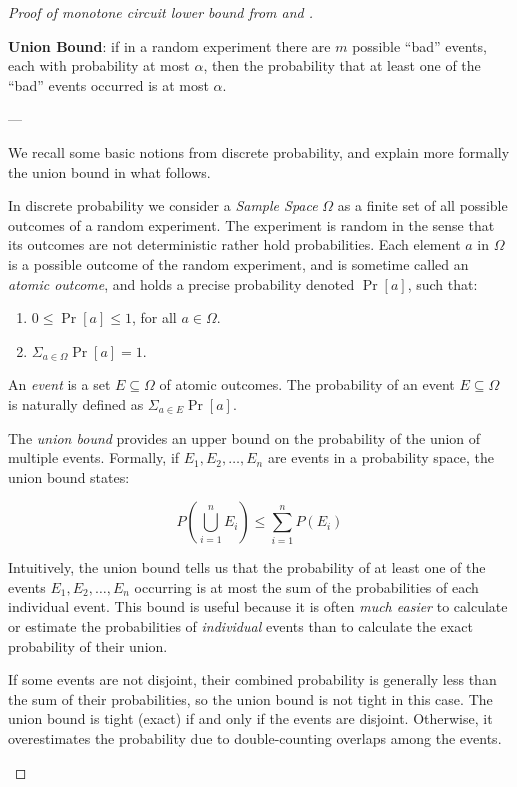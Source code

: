 \begin{proof}[Proof of  monotone circuit lower bound from  and ]
\begin{tcolorbox}[colframe=white, colback=blue!8, boxrule=0mm, sharp corners]
\textbf{Union Bound}: if in a random experiment
there are $m$ possible ``bad'' events, each with probability at most $\alpha$, then the probability that at least one of the ``bad'' events occurred is at most $\alpha$.

\small
\medskip 
---

We recall some  basic notions from  discrete probability, and explain more formally the union bound in what follows.

In discrete probability we consider a \emph{ Sample Space}
$\Omega$ as a finite set of  all possible outcomes of a random experiment. The experiment is random in the sense that its outcomes are not deterministic rather hold  probabilities. 
Each element $a$ in $\Omega$ is a possible outcome of the  random experiment, and is sometime called an \emph{atomic outcome}, and  holds a precise probability denoted $\Pr\left[a \right]$, such that:
\begin{enumerate}
\item $0\le \Pr\left[a\right]\le 1$, for all $a\in\Omega$.

\item $\Sigma_{a\in\Omega}\Pr[a]=1$.
\end{enumerate} 

An \emph{event} is a set $E\subseteq\Omega$ of atomic outcomes. The probability of an event $E\subseteq\Omega$ is naturally defined as $\Sigma_{a\in E}\Pr[a]$. 


\bigskip 
The \emph{union bound} provides an upper bound on the probability of the union of multiple events. Formally, if \( E_1, E_2, \dots, E_n \) are events in a probability space, the union bound states:

\[
P\left(\bigcup_{i=1}^n E_i\right) \leq \sum_{i=1}^n P(E_i)
\]

Intuitively, the union bound tells us that the probability of at least one of the events \( E_1, E_2, \dots, E_n \) occurring is at most the sum of the probabilities of each individual event. This bound is useful because it is often \emph{much easier} to calculate or estimate the probabilities of \emph{individual} events than to calculate the exact probability of their union.

 If some events are not disjoint, their combined probability is generally less than the sum of their probabilities, so the union bound is not tight in this case. The union bound is tight (exact) if and only if the events are disjoint. Otherwise, it overestimates the probability due to double-counting overlaps among the events.





\end{tcolorbox}
\end{proof}
